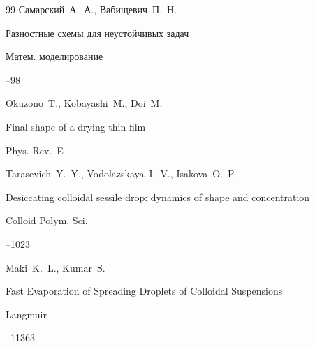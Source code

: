 \begin{thebibliography}{99}
\by Самарский~А.~А., Вабищевич~П.~Н.

\paper Разностные схемы для неустойчивых задач

\jour Матем. моделирование




--98







\by Okuzono~T., Kobayashi~M., Doi~M.

\paper  Final shape of a drying thin film

\jour Phys. Rev.~E









\by Tarasevich~Y.~Y., Vodolazskaya~I.~V., Isakova~O.~P. 

\paper Desiccating colloidal sessile drop: dynamics of shape and concentration

\jour Colloid Polym. Sci.




--1023





\by Maki~K.~L., Kumar~S.

\paper  Fast Evaporation of Spreading Droplets of Colloidal Suspensions

\jour Langmuir




--11363





\end{thebibliography}
